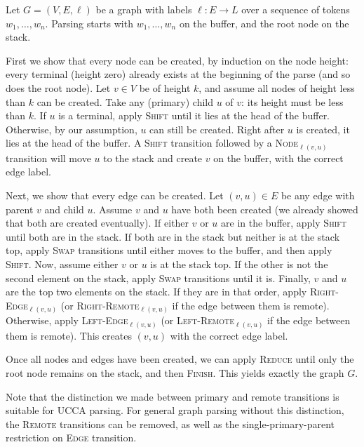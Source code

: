 \documentclass[11pt,a4paper]{article}
\begin{document}
Let $G=(V,E,\ell)$ be a graph with labels $\ell:E\rightarrow L$
over a sequence of tokens $w_1, \ldots, w_n$.
Parsing starts with $w_1, \ldots, w_n$ on the buffer,
and the root node on the stack.

First we show that every node can be created, by induction on the node height:
every terminal (height zero) already exists at the beginning of the parse
(and so does the root node).
Let $v\in V$ be of height $k$, and assume all nodes of height less than $k$ can be created.
Take any (primary) child $u$ of $v$: its height must be less than $k$.
If $u$ is a terminal, apply \textsc{Shift} until it lies at the head of the buffer.
Otherwise, by our assumption, $u$ can still be created.
Right after $u$ is created, it lies at the head of the buffer.
A \textsc{Shift} transition followed by a \textsc{Node}$_{\ell(v,u)}$ transition will
move $u$ to the stack and create $v$ on the buffer, with the correct edge label.

Next, we show that every edge can be created.
Let $(v,u) \in E$ be any edge with parent $v$ and child $u$.
Assume $v$ and $u$ have both been created (we already showed that both are created eventually).
If either $v$ or $u$ are in the buffer, apply \textsc{Shift} until both are in the stack.
If both are in the stack but neither is at the stack top, apply \textsc{Swap} transitions
until either moves to the buffer, and then apply \textsc{Shift}.
Now, assume either $v$ or $u$ is at the stack top.
If the other is not the second element on the stack, apply \textsc{Swap} transitions until it is.
Finally, $v$ and $u$ are the top two elements on the stack.
If they are in that order, apply \textsc{Right-Edge}$_{\ell(v,u)}$
(or \textsc{Right-Remote}$_{\ell(v,u)}$ if the edge between them is remote).
Otherwise, apply \textsc{Left-Edge}$_{\ell(v,u)}$
(or \textsc{Left-Remote}$_{\ell(v,u)}$ if the edge between them is remote).
This creates $(v,u)$ with the correct edge label.

Once all nodes and edges have been created, we can apply \textsc{Reduce} until only the
root node remains on the stack, and then \textsc{Finish}.
This yields exactly the graph $G$.

Note that the distinction we made between primary and remote transitions is suitable for UCCA parsing.
For general graph parsing without this distinction,
the \textsc{Remote} transitions can be removed, as well as the single-primary-parent
restriction on \textsc{Edge} transition.


\end{document}
